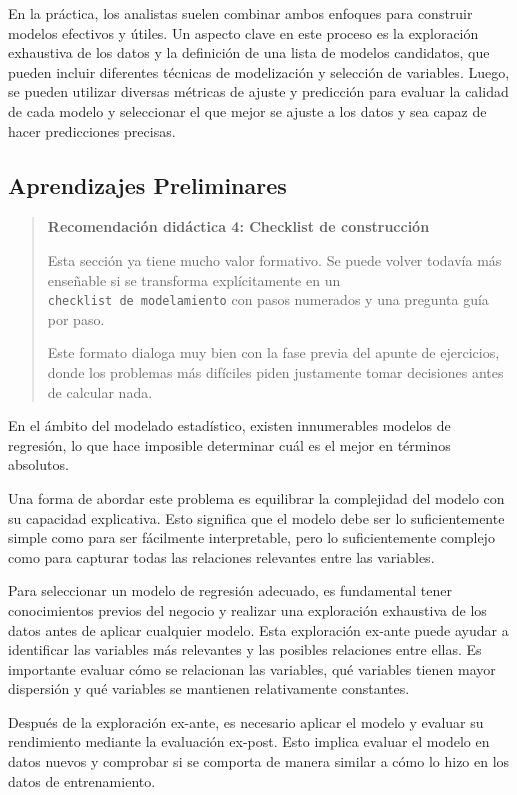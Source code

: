 \documentclass[
]{book}
\begin{document}
En la práctica, los analistas suelen combinar ambos enfoques para
construir modelos efectivos y útiles. Un aspecto clave en este proceso
es la exploración exhaustiva de los datos y la definición de una lista
de modelos candidatos, que pueden incluir diferentes técnicas de
modelización y selección de variables. Luego, se pueden utilizar
diversas métricas de ajuste y predicción para evaluar la calidad de cada
modelo y seleccionar el que mejor se ajuste a los datos y sea capaz de
hacer predicciones precisas.

\subsection{Aprendizajes Preliminares}\label{aprendizajes-preliminares-1}

\begin{quote}
\textbf{Recomendación didáctica 4: Checklist de construcción}

Esta sección ya tiene mucho valor formativo. Se puede volver todavía
más enseñable si se transforma explícitamente en un \texttt{checklist\ de\ modelamiento} con pasos numerados y una pregunta guía por paso.

Este formato dialoga muy bien con la fase previa del apunte de
ejercicios, donde los problemas más difíciles piden justamente tomar
decisiones antes de calcular nada.
\end{quote}

En el ámbito del modelado estadístico, existen innumerables modelos de
regresión, lo que hace imposible determinar cuál es el mejor en términos
absolutos.

Una forma de abordar este problema es equilibrar la complejidad del
modelo con su capacidad explicativa. Esto significa que el modelo debe
ser lo suficientemente simple como para ser fácilmente interpretable,
pero lo suficientemente complejo como para capturar todas las relaciones
relevantes entre las variables.

Para seleccionar un modelo de regresión adecuado, es fundamental tener
conocimientos previos del negocio y realizar una exploración exhaustiva
de los datos antes de aplicar cualquier modelo. Esta exploración ex-ante
puede ayudar a identificar las variables más relevantes y las posibles
relaciones entre ellas. Es importante evaluar cómo se relacionan las
variables, qué variables tienen mayor dispersión y qué variables se
mantienen relativamente constantes.

Después de la exploración ex-ante, es necesario aplicar el modelo y
evaluar su rendimiento mediante la evaluación ex-post. Esto implica
evaluar el modelo en datos nuevos y comprobar si se comporta de manera
similar a cómo lo hizo en los datos de entrenamiento.
\end{document}

